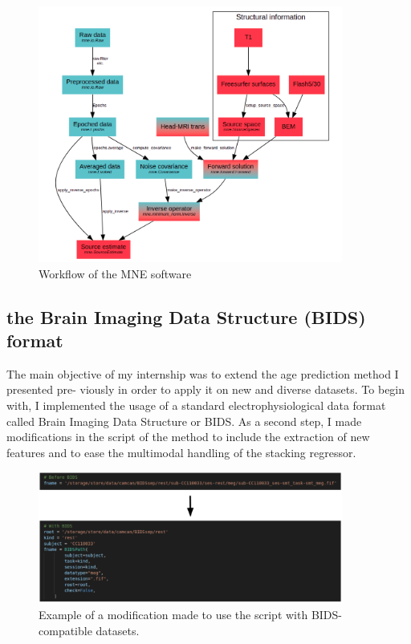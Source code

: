 \begin{figure}[ht]
    \centering
    \includegraphics[width=10cm]{images_report/workflow_of_the_mne_software.png}
    \caption{Workflow of the MNE software \cite{GramfortEtAl2013a}}
\end{figure}


\subsection{the Brain Imaging Data Structure (BIDS) format}

The main objective of my internship was to extend the age prediction method I presented pre-
viously in order to apply it on new and diverse datasets. To begin with, I implemented the usage
of a standard electrophysiological data format called Brain Imaging Data Structure or BIDS. As
a second step, I made modifications in the script of the method to include the extraction of new
features and to ease the multimodal handling of the stacking regressor.

\begin{figure}[ht]
    \centering
    \includegraphics[width=10cm]{images_report/bids_example.png}
    \caption{Example of a modification made to use the script with BIDS-compatible datasets.}
    \label{bids_example}
\end{figure}

